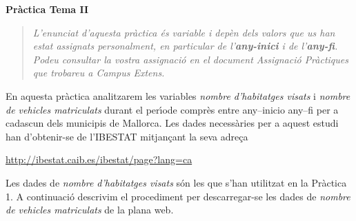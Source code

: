 \documentclass[11pt]{article}
\begin{document}
\vspace{0.3cm}
\noindent
\textbf{Pr\`actica Tema II}

\vspace{0.3cm}


\begin{quotation}
\textit{L'enunciat d'aquesta pr\`actica \'es variable i dep\`en dels valors que us han estat assignats personalment, en particular de l'\textbf{any-inici} i
de l'\textbf{any-fi}. Podeu consultar la vostra assignaci\'o en el document \textit{Assignaci\'o Pr\`actiques} que trobareu a Campus Extens.}
\end{quotation}

En aquesta pr\`actica analitzarem les variables \textit{nombre d'habitatges visats} i \textit{nombre de vehicles matriculats} durant el per\'{\i}ode compr\`es entre any--inicio any--fi per a cadascun dels municipis de Mallorca. Les dades necess\`aries per a aquest estudi han d'obtenir-se de l'IBESTAT mitjan\c{c}ant la seva adre\c{c}a 
\begin{center}
\url{http://ibestat.caib.es/ibestat/page?lang=ca}
\end{center}
Les dades de \textit{nombre d'habitatges visats} s\'on les que s'han utilitzat en la Pr\`actica 1. 
A continuaci\'o descrivim el procediment per descarregar-se les dades de \textit{nombre de vehicles matriculats} de la plana web.
\end{document}

